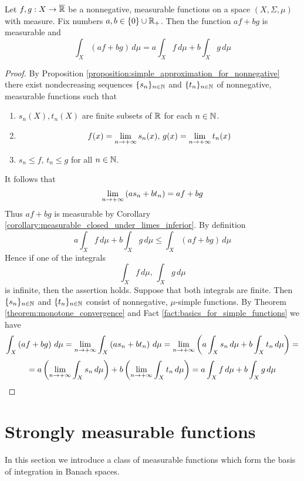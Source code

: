 \begin{proposition}\label{proposition:integral_is_linear}
    Let $f,g:X\rightarrow \overline{{\mathbb R}}$ be a nonnegative, measurable functions on a space $(X,\Sigma,\mu)$ with measure. Fix numbers $a, b\in \{0\}\cup {\mathbb R}_+$. Then the function $a f+b  g$ is measurable and
    $$\int_X\left(a f+b  g\right)\,d\mu = a \int_Xf\,d\mu + b \int_Xg\,d\mu$$
\end{proposition}
\begin{proof}
    By Proposition \ref{proposition:simple_approximation_for_nonnegative} there exist nondecreasing sequences $\{s_n\}_{n\in {\mathbb N}}$ and $\{t_n\}_{n\in {\mathbb N}}$ of nonnegative, measurable functions such that
    \begin{enumerate}[label=\textbf{(\arabic*)}, leftmargin=*]
        \item $s_n(X),t_n(X)$ are finite subsets of ${\mathbb R}$ for each $n\in {\mathbb N}$.
        \item $$f(x) = \lim_{n\rightarrow +\infty}s_n(x),\,g(x) = \lim_{n\rightarrow +\infty}t_n(x)$$
        \item $s_n \leq f,\,t_n\leq g$ for all $n \in {\mathbb N}$.
    \end{enumerate}
    It follows that
    $$\lim_{n \rightarrow +\infty}\left(as_n + bt_n\right) = af + bg$$
    Thus $af+bg$ is measurable by Corollary \ref{corollary:measurable_closed_under_limes_inferior}.
    By definition
    $$a \int_Xf\,d\mu + b \int_Xg\,d\mu \leq \int_X\left(a f+b  g\right)\,d\mu $$
    Hence if one of the integrals
    $$\int_Xf\,d\mu,\,\int_Xg\,d\mu$$
    is infinite, then the assertion holds. Suppose that both integrals are finite. Then $\{s_n\}_{n\in {\mathbb N}}$ and $\{t_n\}_{n\in {\mathbb N}}$ consist of nonnegative, $\mu$-simple functions. By Theorem \ref{theorem:monotone_convergence} and Fact \ref{fact:basics_for_simple_functions} we have
    $$\int_X\left(a f + b g\right)\,d\mu = \lim_{n\rightarrow +\infty}\int_X\left(a s_n + b t_n\right)\,d\mu = \lim_{n\rightarrow +\infty}\left(a \int_Xs_n\,d\mu + b \int_Xt_n\,d\mu\right) =$$
    $$=a  \left(\lim_{n\rightarrow +\infty}\int_Xs_n\,d\mu\right) + b \left(\lim_{n\rightarrow +\infty}\int_Xt_n\,d\mu\right) = a \int_Xf\,d\mu + b \int_Xg\,d\mu$$
\end{proof}

\section{Strongly measurable functions}
\noindent
In this section we introduce a class of measurable functions which form the basis of integration in Banach spaces.

